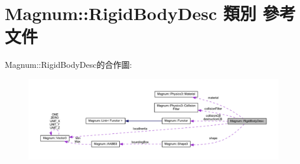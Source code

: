 \hypertarget{class_magnum_1_1_rigid_body_desc}{}\section{Magnum\+:\+:Rigid\+Body\+Desc 類別 參考文件}
\label{class_magnum_1_1_rigid_body_desc}


Magnum\+:\+:Rigid\+Body\+Desc的合作圖\+:\nopagebreak
\begin{figure}[H]
\begin{center}
\leavevmode
\includegraphics[width=350pt]{class_magnum_1_1_rigid_body_desc__coll__graph}
\end{center}
\end{figure}
